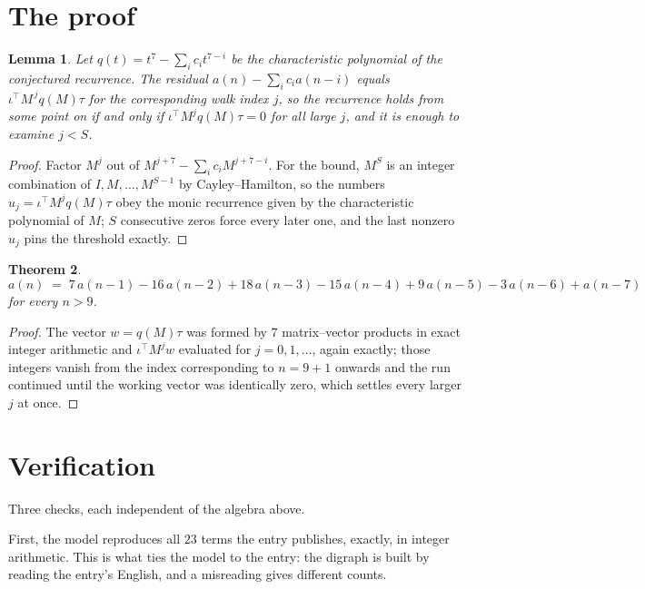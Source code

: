\documentclass[11pt,a4paper]{article}
\theoremstyle{plain}
\newtheorem{theorem}{Theorem}
\newtheorem{lemma}[theorem]{Lemma}
\theoremstyle{definition}
\begin{document}
\section{The proof}

\begin{lemma}\label{lem:crit}
Let $q(t)=t^{7}-\sum_i c_it^{7-i}$ be the characteristic polynomial of the
conjectured recurrence. The residual $a(n)-\sum_ic_ia(n-i)$ equals
$\iota^{\!\top}M^{\,j}q(M)\tau$ for the corresponding walk index $j$, so the recurrence
holds from some point on if and only if $\iota^{\!\top}M^{j}q(M)\tau=0$ for all large $j$,
and it is enough to examine $j<S$.
\end{lemma}

\begin{proof}
Factor $M^{j}$ out of $M^{j+7}-\sum_ic_iM^{j+7-i}$. For the bound, $M^{S}$
is an integer combination of $I,M,\dots,M^{S-1}$ by Cayley--Hamilton, so the numbers
$u_j=\iota^{\!\top}M^{j}q(M)\tau$ obey the monic recurrence given by the characteristic
polynomial of $M$; $S$ consecutive zeros force every later one, and the last nonzero $u_j$
pins the threshold exactly.
\end{proof}

\begin{theorem}
\[
a(n)\;=\;7\,a(n-1) - 16\,a(n-2) + 18\,a(n-3) - 15\,a(n-4) + 9\,a(n-5) - 3\,a(n-6) + a(n-7)
\]
for every $n>9$.
\end{theorem}

\begin{proof}
The vector $w=q(M)\tau$ was formed by $7$ matrix--vector products in exact integer
arithmetic and $\iota^{\!\top}M^{j}w$ evaluated for $j=0,1,\dots$, again exactly; those
integers vanish from the index corresponding to $n=9+1$ onwards and the run continued
until the working vector was identically zero, which settles every larger $j$ at once.
\end{proof}

\section{Verification}

Three checks, each independent of the algebra above.

First, the model reproduces all $23$ terms the entry publishes, exactly, in integer
arithmetic. This is what ties the model to the entry: the digraph is built by reading the
entry's English, and a misreading gives different counts.
\end{document}
